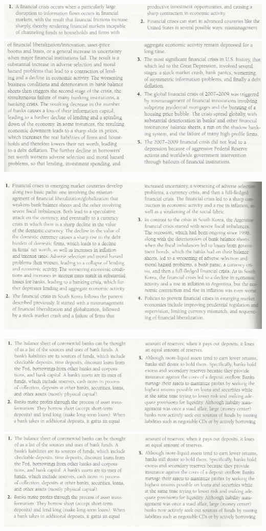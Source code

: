 \documentclass[12pt]{examnotes}
\begin{document}
\begin{center}
  \includegraphics[scale=0.5]{./imgs/c9sum1.jpg}
    \includegraphics[scale=0.5]{./imgs/c9sum2.jpg}
\end{center}

\begin{center}
  \includegraphics[scale=0.5]{./imgs/c10sum.jpg}
\end{center}

\begin{center}
  \includegraphics[scale=0.45]{./imgs/c11sum1.jpg}
  \includegraphics[scale=0.45]{./imgs/c11sum1.jpg}
\end{center}
\end{document}

